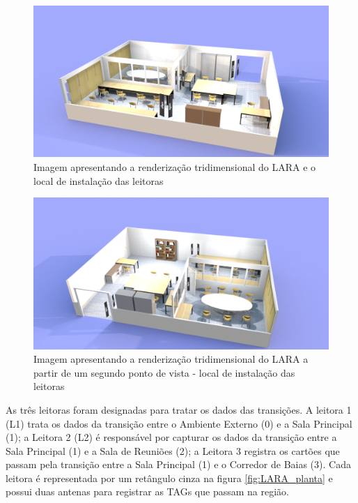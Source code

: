  \begin{figure}[H]
    \centering
    \includegraphics[width=1\linewidth]{figs/Metodologia/LARA_leitoras-1.png}
    \caption{Imagem apresentando a renderização tridimensional do LARA e o local de instalação das leitoras}
    \label{fig:LARA1}
\end{figure}

  \begin{figure}[H]
    \centering
    \includegraphics[width=1\linewidth]{figs/Metodologia/LARA_leitoras-2.png}
    \caption{Imagem apresentando a renderização tridimensional do LARA a partir de um segundo ponto de vista - local de instalação das leitoras}
    \label{fig:LARA2}
\end{figure}

As três leitoras foram designadas para tratar os dados das transições. A leitora 1 (L1) trata os dados da transição entre o Ambiente Externo (0) e a Sala Principal (1); a Leitora 2 (L2) é responsável por capturar os dados da transição entre a Sala Principal (1) e a Sala de Reuniões (2); a Leitora 3 registra os cartões que passam pela transição entre a Sala Principal (1) e o Corredor de Baias (3). Cada leitora é representada por um retângulo cinza na figura \ref{fig:LARA_planta} e possui duas antenas para registrar as TAGs que passam na região.

